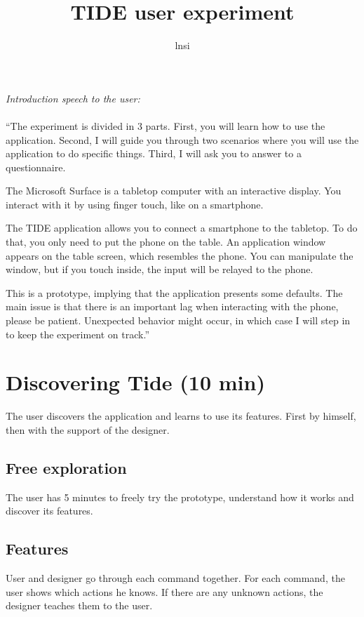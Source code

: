 \documentclass[11pt]{amsart}
\title{TIDE user experiment}
\author{lnsi}
\begin{document}
\maketitle

\emph{Introduction speech to the user:}
\\\\
``The experiment is divided in 3 parts.
First, you will learn how to use the application.
Second, I will guide you through two scenarios where you will use the application to do specific things.
Third, I will ask you to answer to a questionnaire.

The Microsoft Surface is a tabletop computer with an interactive display.
You interact with it by using finger touch, like on a smartphone.

The TIDE application allows you to connect a smartphone to the tabletop.
To do that, you only need to put the phone on the table.
An application window appears on the table screen, which resembles the phone.
You can manipulate the window, but if you touch inside, the input will be relayed to the phone.

This is a prototype, implying that the application presents some defaults.
The main issue is that there is an important lag when interacting with the phone, please be patient.
Unexpected behavior might occur, in which case I will step in to keep the experiment on track.''

\section{Discovering Tide (10 min)}

The user discovers the application and learns to use its features.
First by himself, then with the support of the designer.

\subsection{Free exploration}
 
The user has 5 minutes to freely try the prototype, understand how it works and discover its features.

\subsection{Features}

User and designer go through each command together.
For each command, the user shows which actions he knows.
If there are any unknown actions, the designer teaches them to the user.
\end{document}
